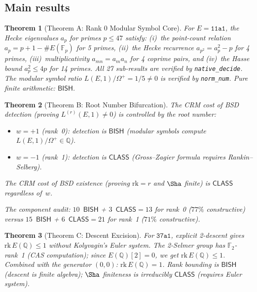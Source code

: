 \documentclass[11pt]{article}
\theoremstyle{plain}
\newtheorem{theorem}{Theorem}[section]
\theoremstyle{definition}
\theoremstyle{remark}
\newcommand{\Q}{\mathbb{Q}}
\newcommand{\F}{\mathbb{F}}
\newcommand{\rk}{\mathrm{rk}}
\newcommand{\BISH}{\ensuremath{\mathsf{BISH}}}
\newcommand{\CLASS}{\ensuremath{\mathsf{CLASS}}}
\begin{document}
\subsection{Main results}

\begin{theorem}[Theorem A: Rank 0 Modular Symbol Core]
\label{thm:A}
For $E = \texttt{11a1}$, the Hecke eigenvalues $a_p$ for primes $p \leq 47$ satisfy: (i)~the point-count relation $a_p = p + 1 - \#E(\F_p)$ for 5 primes, (ii)~the Hecke recurrence $a_{p^2} = a_p^2 - p$ for 4 primes, (iii)~multiplicativity $a_{mn} = a_m a_n$ for 4 coprime pairs, and (iv)~the Hasse bound $a_p^2 \leq 4p$ for 14 primes. All 27 sub-results are verified by \texttt{native\_decide}. The modular symbol ratio $L(E,1)/\Omega^+ = 1/5 \neq 0$ is verified by \texttt{norm\_num}. Pure finite arithmetic: $\BISH$.
\end{theorem}

\begin{theorem}[Theorem B: Root Number Bifurcation]
\label{thm:B}
The CRM cost of BSD \emph{detection} (proving $L^{(r)}(E,1) \neq 0$) is controlled by the root number:
\begin{itemize}[nosep]
\item $w = +1$ (rank~0): detection is $\BISH$ (modular symbols compute $L(E,1)/\Omega^+ \in \Q$).
\item $w = -1$ (rank~1): detection is $\CLASS$ (Gross--Zagier formula requires Rankin--Selberg).
\end{itemize}
The CRM cost of BSD \emph{existence} (proving $\rk = r$ and $\Sha$ finite) is $\CLASS$ regardless of~$w$.

The component audit: $10$~$\BISH$ + $3$~$\CLASS = 13$ for rank~0 ($77\%$ constructive) versus $15$~$\BISH$ + $6$~$\CLASS = 21$ for rank~1 ($71\%$ constructive).
\end{theorem}

\begin{theorem}[Theorem C: Descent Excision]
\label{thm:C}
For $\texttt{37a1}$, explicit 2-descent gives $\rk\, E(\Q) \leq 1$ without Kolyvagin's Euler system. The 2-Selmer group has $\F_2$-rank~1 (CAS computation); since $E(\Q)[2] = 0$, we get $\rk\, E(\Q) \leq 1$. Combined with the generator $(0,0)$: $\rk\, E(\Q) = 1$. Rank bounding is $\BISH$ (descent is finite algebra); $\Sha$ finiteness is irreducibly $\CLASS$ (requires Euler system).
\end{theorem}
\end{document}
